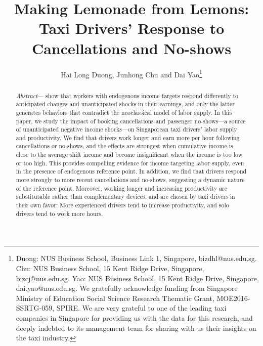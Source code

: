 \documentclass[reviewmode]{restat}
\begin{document}

\title{Making Lemonade from Lemons: Taxi Drivers' Response to Cancellations and No-shows}
\author{Hai Long Duong, Junhong Chu and Dai Yao\thanks{Duong: NUS Business School, Business Link 1, Singapore, bizdhl@nus.edu.sg. Chu: NUS Business School, 15 Kent Ridge Drive, Singapore, bizcj@nus.edu.sg. Yao: NUS Business School, 15 Kent Ridge Drive, Singapore, dai.yao@nus.edu.sg. We gratefully acknowledge funding from Singapore Ministry of Education Social Science Research Thematic Grant, MOE2016-SSRTG-059, SPIRE. We are very grateful to one of the leading taxi companies in Singapore for providing us with the data for this research, and deeply indebted to its management team for sharing with us their insights on the taxi industry.}}


\begin{abstract}
	\textit{Abstract}---\cite{kHoszegi2006model} show that workers with endogenous income targets respond differently
	to anticipated changes and unanticipated shocks in their earnings, and only the latter generates
	behaviors that contradict the neoclassical model of labor supply. In this paper, we study the
	impact of booking cancellations and passenger no-shows---a source of unanticipated negative 
	income shocks---on Singaporean taxi drivers' labor supply and productivity. We find that 
	drivers work longer and earn more per hour following cancellations or no-shows, and the 
    effects are strongest when cumulative income is close to the average shift income and become 
    insignificant when the income is too low or too high. This provides 
	compelling evidence for income targeting labor supply, even in the presence of endogenous 
	reference point. In addition, we find that drivers respond more strongly to more recent 
	cancellations and no-shows, suggesting a dynamic nature of the reference point. Moreover, 
	working longer and increasing productivity are substitutable rather than complementary devices, 
	and are chosen by taxi drivers in their own favor: More experienced drivers tend to increase 
	productivity, and solo drivers tend to work more hours. 
\end{abstract}
\end{document}
